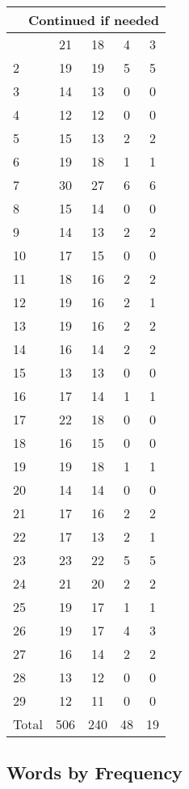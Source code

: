 \begin{center}
\begin{longtable}{l|c|c|c|c}
\hline \multicolumn{5}{|r|}{{Continued if needed}} \\ \hline
\endfoot 
1 & 21 & 18 & 4 & 3\\ \hline
2 & 19 & 19 & 5 & 5\\ \hline
3 & 14 & 13 & 0 & 0\\ \hline
4 & 12 & 12 & 0 & 0\\ \hline
5 & 15 & 13 & 2 & 2\\ \hline
6 & 19 & 18 & 1 & 1\\ \hline
7 & 30 & 27 & 6 & 6\\ \hline
8 & 15 & 14 & 0 & 0\\ \hline
9 & 14 & 13 & 2 & 2\\ \hline
10 & 17 & 15 & 0 & 0\\ \hline
11 & 18 & 16 & 2 & 2\\ \hline
12 & 19 & 16 & 2 & 1\\ \hline
13 & 19 & 16 & 2 & 2\\ \hline
14 & 16 & 14 & 2 & 2\\ \hline
15 & 13 & 13 & 0 & 0\\ \hline
16 & 17 & 14 & 1 & 1\\ \hline
17 & 22 & 18 & 0 & 0\\ \hline
18 & 16 & 15 & 0 & 0\\ \hline
19 & 19 & 18 & 1 & 1\\ \hline
20 & 14 & 14 & 0 & 0\\ \hline
21 & 17 & 16 & 2 & 2\\ \hline
22 & 17 & 13 & 2 & 1\\ \hline
23 & 23 & 22 & 5 & 5\\ \hline
24 & 21 & 20 & 2 & 2\\ \hline
25 & 19 & 17 & 1 & 1\\ \hline
26 & 19 & 17 & 4 & 3\\ \hline
27 & 16 & 14 & 2 & 2\\ \hline
28 & 13 & 12 & 0 & 0\\ \hline
29 & 12 & 11 & 0 & 0\\ \hline
\hline \hline
Total & 506 & 240 & 48 & 19




\end{longtable}
\end{center}



\subsection{Words by Frequency}

